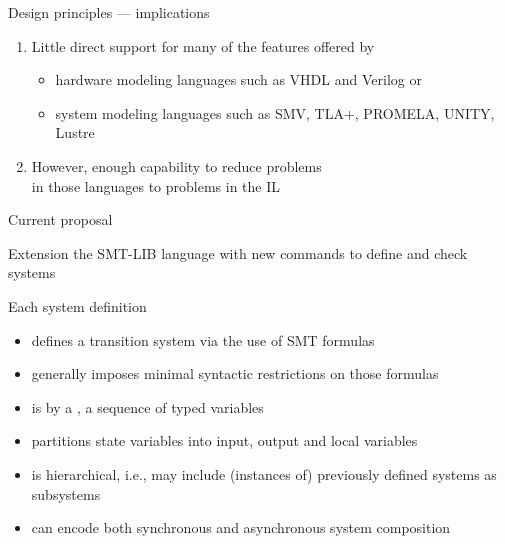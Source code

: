 \documentclass[10pt,aspectratio=149]{beamer}
\begin{document}

\begin{frame}{Design principles --- implications }
\large

\begin{enumerate}
\item
\alert{Little direct support} for many of the \alert{features} offered by 
\medskip

\begin{itemize}\normalsize
\item
hardware modeling languages such as VHDL and Verilog or
\medskip

\item
system modeling languages such as SMV, TLA+, PROMELA, UNITY, Lustre
\end{itemize}
\bigskip
\bigskip
\pause

\item
However, enough \alert{capability}
to \alert{reduce} problems \\[.5ex]
in those languages \alert{to} problems in the \alert{IL}
\end{enumerate}

\end{frame}


\begin{frame}{Current proposal}

\alert{Extension} the \alert{SMT-LIB} language with \alert{new commands} to define and check systems

\bigskip
\medskip
\pause

Each system definition
\medskip

\begin{itemize}
\item<2,8>
defines a \alert{transition system} via the use of SMT formulas
\medskip

\item<3,8>
generally imposes \alert{minimal syntactic restrictions} on those formulas
\medskip

\item<4,8>
is  by a , a sequence of typed variables
\medskip

\item<5,8>
partitions state variables into \alert{input}, \alert{output} and \alert{local} variables
\medskip

\item<6,8>
is \alert{hierarchical}, i.e., may include (instances of) previously defined systems as subsystems 
\medskip

\item<7,8>
can \alert{encode} both \alert{synchronous and asynchronous} system composition 
\end{itemize}

\end{frame}
\end{document}

